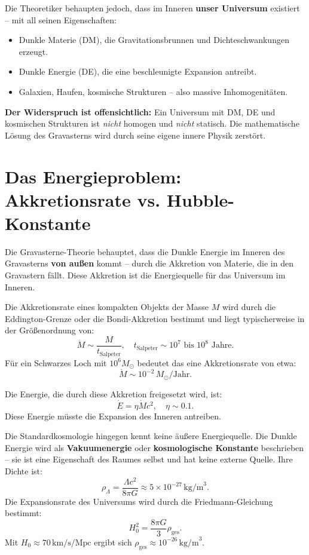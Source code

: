 \documentclass[12pt,a4paper]{article}
\begin{document}
Die Theoretiker behaupten jedoch, dass im Inneren \textbf{unser Universum} existiert – mit all seinen Eigenschaften:
\begin{itemize}
    \item Dunkle Materie (DM), die Gravitationsbrunnen und Dichteschwankungen erzeugt.
    \item Dunkle Energie (DE), die eine beschleunigte Expansion antreibt.
    \item Galaxien, Haufen, kosmische Strukturen – also massive Inhomogenitäten.
\end{itemize}

\textbf{Der Widerspruch ist offensichtlich:} Ein Universum mit DM, DE und kosmischen Strukturen ist \emph{nicht} homogen und \emph{nicht} statisch. Die mathematische Lösung des Gravasterns wird durch seine eigene innere Physik zerstört.

\section{Das Energieproblem: Akkretionsrate vs. Hubble-Konstante}

Die Gravasterne-Theorie behauptet, dass die Dunkle Energie im Inneren des Gravasterns \textbf{von außen} kommt – durch die Akkretion von Materie, die in den Gravastern fällt. Diese Akkretion ist die Energiequelle für das Universum im Inneren.

Die Akkretionsrate eines kompakten Objekts der Masse $M$ wird durch die Eddington-Grenze oder die Bondi-Akkretion bestimmt und liegt typischerweise in der Größenordnung von:
\begin{equation}
\dot{M} \sim \frac{M}{t_{\text{Salpeter}}}, \quad t_{\text{Salpeter}} \sim 10^7 \text{ bis } 10^8 \text{ Jahre}.
\end{equation}
Für ein Schwarzes Loch mit $10^6 M_\odot$ bedeutet das eine Akkretionsrate von etwa:
\begin{equation}
\dot{M} \sim 10^{-2} \, M_\odot/\text{Jahr}.
\end{equation}

Die Energie, die durch diese Akkretion freigesetzt wird, ist:
\begin{equation}
\dot{E} = \eta \dot{M} c^2, \quad \eta \sim 0.1.
\end{equation}
Diese Energie müsste die Expansion des Inneren antreiben.

Die Standardkosmologie hingegen kennt keine äußere Energiequelle. Die Dunkle Energie wird als \textbf{Vakuumenergie} oder \textbf{kosmologische Konstante} beschrieben – sie ist eine Eigenschaft des Raumes selbst und hat keine externe Quelle. Ihre Dichte ist:
\begin{equation}
\rho_{\Lambda} = \frac{\Lambda c^2}{8\pi G} \approx 5 \times 10^{-27} \, \text{kg/m}^3.
\end{equation}
Die Expansionsrate des Universums wird durch die Friedmann-Gleichung bestimmt:
\begin{equation}
H_0^2 = \frac{8\pi G}{3} \rho_{\text{ges}}.
\end{equation}
Mit $H_0 \approx 70 \, \text{km/s/Mpc}$ ergibt sich $\rho_{\text{ges}} \approx 10^{-26} \, \text{kg/m}^3$.
\end{document}
